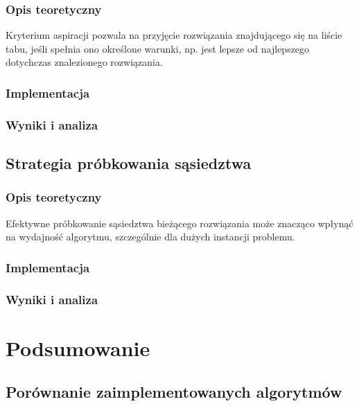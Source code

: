 \documentclass[12pt,a4paper]{article}
\begin{document}
\subsubsection{Opis teoretyczny}
Kryterium aspiracji pozwala na przyjęcie rozwiązania znajdującego się na liście tabu, jeśli spełnia ono określone warunki, np. jest lepsze od najlepszego dotychczas znalezionego rozwiązania.

\subsubsection{Implementacja}

\subsubsection{Wyniki i analiza}

\subsection{Strategia próbkowania sąsiedztwa}
\subsubsection{Opis teoretyczny}
Efektywne próbkowanie sąsiedztwa bieżącego rozwiązania może znacząco wpłynąć na wydajność algorytmu, szczególnie dla dużych instancji problemu.

\subsubsection{Implementacja}

\subsubsection{Wyniki i analiza}

\section{Podsumowanie}
\subsection{Porównanie zaimplementowanych algorytmów}
\end{document}
